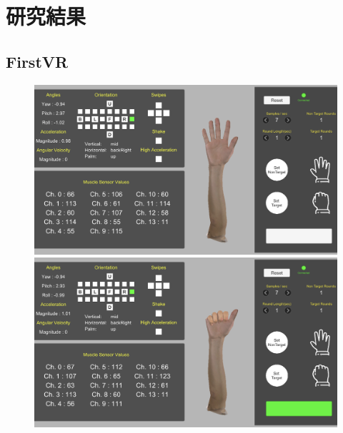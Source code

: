 \documentclass{ltjsreport}
\begin{document}
\chapter{研究結果}
	\section{FirstVR}
		
		\begin{figure}[H]
		\centering
		\begin{minipage}{0.75\columnwidth}
		\centering
		\includegraphics[width = \columnwidth]{../figs/IMG_1866.PNG}
		\end{minipage}
		\hspace{0.04\columnwidth}
		\begin{minipage}{0.75\columnwidth}
		\centering
		\includegraphics[width = \columnwidth]{../figs/IMG_1867.PNG}
		\end{minipage}
		\caption{}
		\end{figure}
\end{document}
